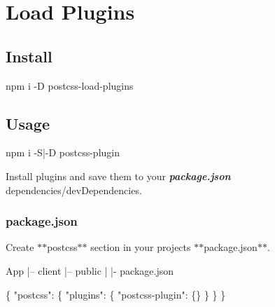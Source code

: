 \href{https://npmjs.com/package/postcss-load-plugins}{\tt } \href{https://nodejs.org/}{\tt } \href{https://david-dm.org/michael-ciniawsky/postcss-load-plugins}{\tt } \href{https://travis-ci.org/michael-ciniawsky/postcss-load-plugins}{\tt } \href{https://coveralls.io/github/michael-ciniawsky/postcss-load-plugins}{\tt } \href{http://standardjs.com/}{\tt } \href{https://gitter.im/postcss/postcss}{\tt }

  \href{https://github.com/postcss/postcss}{\tt } \section*{Load Plugins}

 

\subsection*{Install}


\begin{DoxyCode}
npm i -D postcss-load-plugins
\end{DoxyCode}


\subsection*{Usage}


\begin{DoxyCode}
npm i -S|-D postcss-plugin
\end{DoxyCode}


Install plugins and save them to your {\itshape {\bfseries package.\+json}} dependencies/dev\+Dependencies.

\subsubsection*{{\ttfamily package.\+json}}

Create $\ast$$\ast${\ttfamily postcss}$\ast$$\ast$ section in your projects $\ast$$\ast${\ttfamily package.\+json}$\ast$$\ast$.


\begin{DoxyCode}
App
  |– client
  |– public
  |
  |- package.json
\end{DoxyCode}



\begin{DoxyCode}
\{
  "postcss": \{
    "plugins": \{
      "postcss-plugin": \{\}
    \}
  \}
\}
\end{DoxyCode}


